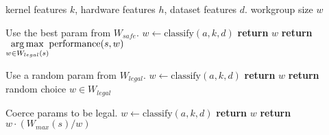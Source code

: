 \begin{algorithmic}[1]
\Require kernel features $k$, hardware features $h$, dataset features
$d$.
\Ensure workgroup size $w$

\Comment Use the best param from $W_{safe}$.
\State $w \leftarrow \text{classify}(a, k, d)$
    \State \textbf{return} $w$
\Else
  \State \textbf{return} $\underset{w \in W_{legal}(s)}{\operatorname*{arg\,max}} \text{performance}(s,w)$
\EndIf
\EndProcedure
\item[]

\Comment Use a random param from $W_{legal}$.
\State $w \leftarrow \text{classify}(a, k, d)$
    \State \textbf{return} $w$
\Else
  \State \textbf{return} random choice $w \in W_{legal}$
\EndIf
\EndProcedure
\item[]

\Comment Coerce params to be legal.
\State $w \leftarrow \text{classify}(a, k, d)$
    \State \textbf{return} $w$
\Else
  \State \textbf{return} $w \cdot (W_{max}(s) / w)$
\EndIf
\EndProcedure
\end{algorithmic}
